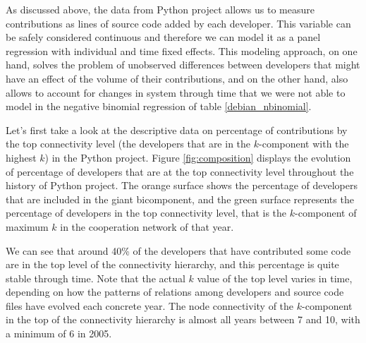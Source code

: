 As discussed above, the data from Python project allows us to measure contributions as lines of source code added by each developer. This variable can be safely considered continuous and therefore we can model it as a panel regression with individual and time fixed effects. This modeling approach, on one hand, solves the problem of unobserved differences between developers that might have an effect of the volume of their contributions, and on the other hand, also allows to account for changes in system through time that we were not able to model in the negative binomial regression of table \ref{debian_nbinomial}.
 
Let's first take a look at the descriptive data on percentage of contributions by the top connectivity level (the developers that are in the $k$-component with the highest $k$) in the Python project. Figure \ref{fig:composition} displays the evolution of percentage of developers that are at the top connectivity level throughout the history of Python project. The orange surface shows the percentage of developers that are included in the giant bicomponent, and the green surface represents the percentage of developers in the top connectivity level, that is the $k$-component of maximum $k$ in the cooperation network of that year.

We can see that around 40\% of the developers that have contributed some code are in the top level of the connectivity hierarchy, and this percentage is quite stable through time. Note that the actual $k$ value of the top level varies in time, depending on how the patterns of relations among developers and source code files have evolved each concrete year. The node connectivity of the $k$-component in the top of the connectivity hierarchy is almost all years between 7 and 10, with a minimum of 6 in 2005.

